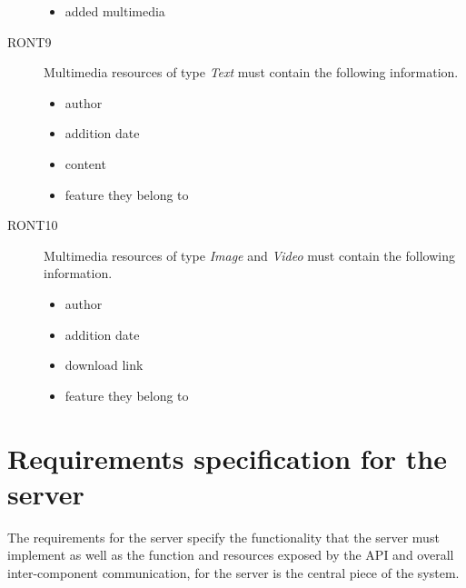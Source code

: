 \begin{description}
\begin{itemize}
\item added multimedia
\end{itemize}
\item[RONT9] Multimedia resources of type \textit{Text} must contain the following information.
\begin{itemize}
\item author
\item addition date
\item content
\item feature they belong to
\end{itemize}
\item[RONT10] Multimedia resources of type \textit{Image} and \textit{Video} must contain the following information.
\begin{itemize}
\item author
\item addition date
\item download link
\item feature they belong to
\end{itemize}
\end{description}

\section{Requirements specification for the server}

The requirements for the server specify the functionality that the server must implement as well as the function and resources exposed by the API and overall inter-component communication, for the server is the central piece of the system.

